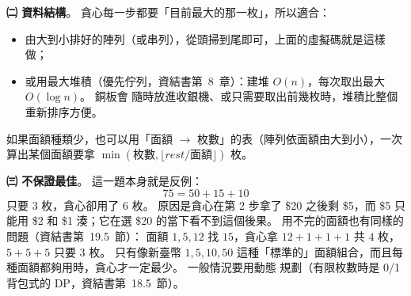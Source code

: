 \begin{pastsoln}
\textbf{㈡ 資料結構}。 貪心每一步都要「目前最大的那一枚」，所以適合：
\begin{itemize}
\item 由大到小排好的陣列（或串列），從頭掃到尾即可，上面的虛擬碼就是這樣做；
\item 或用最大堆積（優先佇列，資結書第~8~章）：建堆 $O(n)$，每次取出最大 $O(\log n)$。 銅板會
隨時放進收銀機、或只需要取出前幾枚時，堆積比整個重新排序方便。
\end{itemize}
如果面額種類少，也可以用「面額 $\to$ 枚數」的表（陣列依面額由大到小），一次算出某個面額要拿
$\min(\text{枚數}, \lfloor \mathit{rest} / \text{面額} \rfloor)$ 枚。

\textbf{㈢ 不保證最佳}。 這一題本身就是反例：
\[
75 = 50 + 15 + 10
\]
只要 $3$ 枚，貪心卻用了 $6$ 枚。 原因是貪心在第 2 步拿了 \$20 之後剩 \$5，而 \$5 只能用
\$2 和 \$1 湊；它在選 \$20 的當下看不到這個後果。 用不完的面額也有同樣的問題（資結書第~19.5~節）：
面額 $1, 5, 12$ 找 $15$，貪心拿 $12 + 1 + 1 + 1$ 共 $4$ 枚，$5 + 5 + 5$ 只要 $3$ 枚。 只有像新臺幣
$1, 5, 10, 50$ 這種「標準的」面額組合，而且每種面額都夠用時，貪心才一定最少。 一般情況要用動態
規劃（有限枚數時是 0/1 背包式的 DP，資結書第~18.5~節）。
\end{pastsoln}
